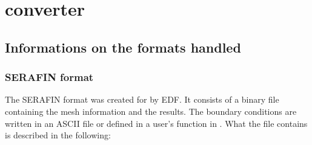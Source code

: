 \chapter{converter}
\section{Informations on the formats handled}

\subsection{SERAFIN format}

The SERAFIN format was created for \telemacsystem by EDF. It consists of a binary file
containing the mesh information and the results.  The boundary conditions are
written in an ASCII file or defined in a user's function in \telemacsystem.  What the
file contains is described in the following:

